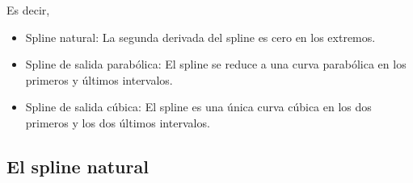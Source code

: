 \noindent Es decir,
\begin{itemize}
    \item Spline natural: La segunda derivada del spline es cero en los extremos.
    \item Spline de salida parabólica: El spline se reduce a una curva parabólica en los primeros y últimos intervalos.
    \item Spline de salida cúbica: El spline es una única curva cúbica en los dos primeros y los dos últimos intervalos.
\end{itemize}

\newpage

\subsection*{El spline natural}

